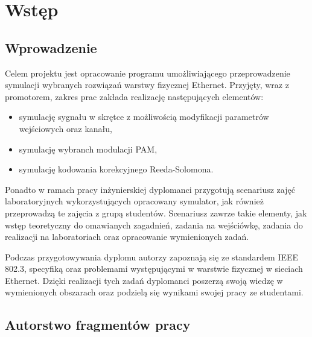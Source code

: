 \section{Wstęp}
\subsection{Wprowadzenie}

Celem projektu jest opracowanie programu umożliwiającego przeprowadzenie symulacji wybranych rozwiązań warstwy fizycznej Ethernet.
Przyjęty, wraz z promotorem, zakres prac zakłada realizację następujących elementów:
\begin{itemize}
    \item symulację sygnału w skrętce z możliwością modyfikacji parametrów wejściowych oraz kanału,
    \item symulację wybranch modulacji PAM,
    \item symulację kodowania korekcyjnego Reeda-Solomona.
\end{itemize}

Ponadto w ramach pracy inżynierskiej dyplomanci przygotują scenariusz zajęć laboratoryjnych wykorzystujących opracowany symulator, jak
również przeprowadzą te zajęcia z grupą studentów. Scenariusz zawrze takie elementy, jak wstęp teoretyczny do omawianych zagadnień,
zadania na wejściówkę, zadania do realizacji na laboratoriach oraz opracowanie wymienionych zadań.

Podczas przygotowywania dyplomu autorzy zapoznają się ze standardem IEEE 802.3, specyfiką oraz problemami występującymi w warstwie fizycznej
w sieciach Ethernet. Dzięki realizacji tych zadań dyplomanci poszerzą swoją wiedzę w wymienionych obszarach oraz podzielą się wynikami
swojej pracy ze studentami.

\subsection{Autorstwo fragmentów pracy}

